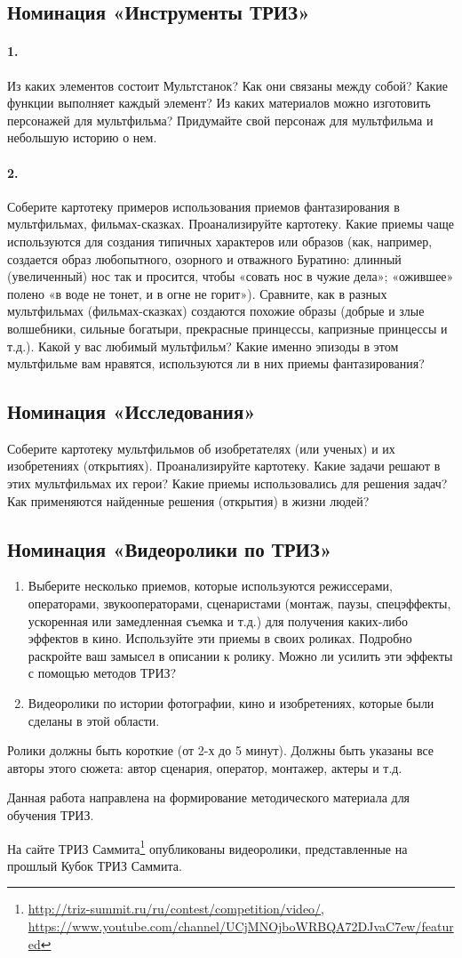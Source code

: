 \documentclass[11pt,a4paper]{article}
\newcommand{\video}{Ролики должны быть короткие (от 2-х до 5 минут). Должны
  быть указаны все авторы этого сюжета: автор сценария, оператор, монтажер,
  актеры и т.д.

Данная работа направлена на формирование методического материала для обучения
ТРИЗ.

На сайте ТРИЗ
Саммита\footnote{\url{http://triz-summit.ru/ru/contest/competition/video/},\\
  \url{https://www.youtube.com/channel/UCjMNOjboWRBQA72DJvaC7ew/featured}}
опубликованы видеоролики, представленные на прошлый Кубок ТРИЗ Саммита.}
\begin{document}
\subsection*{Номинация «Инструменты ТРИЗ»}

\paragraph{1.}
Из каких элементов состоит Мультстанок? Как они связаны между собой? Какие
функции выполняет каждый элемент? Из каких материалов можно изготовить
персонажей для мультфильма? Придумайте свой персонаж для мультфильма и
небольшую историю о нем.

\paragraph{2.}
Соберите картотеку примеров использования приемов фантазирования в
мультфильмах, фильмах-сказках. Проанализируйте картотеку. Какие приемы чаще
используются для создания типичных характеров или образов (как, например,
создается образ любопытного, озорного и отважного Буратино: длинный
(увеличенный) нос так и просится, чтобы «совать нос в чужие дела»; «ожившее»
полено «в воде не тонет, и в огне не горит»). Сравните, как в разных
мультфильмах (фильмах-сказках) создаются похожие образы (добрые и злые
волшебники, сильные богатыри, прекрасные принцессы, капризные принцессы и
т.д.). Какой у вас любимый мультфильм? Какие именно эпизоды в этом
мультфильме вам нравятся, используются ли в них приемы фантазирования?

\subsection*{Номинация «Исследования»}
Соберите картотеку мультфильмов об изобретателях (или ученых) и их
изобретениях (открытиях). Проанализируйте картотеку. Какие задачи решают в
этих мультфильмах их герои? Какие приемы использовались для решения задач? Как
применяются найденные решения (открытия) в жизни людей?

\subsection*{Номинация «Видеоролики по ТРИЗ»}
\begin{enumerate}\itemsep0pt
\item Выберите несколько приемов, которые используются режиссерами,
  операторами, звукооператорами, сценаристами (монтаж, паузы, спецэффекты,
  ускоренная или замедленная съемка и т.д.) для получения каких-либо эффектов
  в кино. Используйте эти приемы в своих роликах. Подробно раскройте ваш
  замысел в описании к ролику. Можно ли усилить эти эффекты с помощью методов
  ТРИЗ?
\item Видеоролики по истории фотографии, кино и изобретениях, которые были
  сделаны в этой области.
\end{enumerate}
\enlargethispage{5em}
\video
\end{document}
